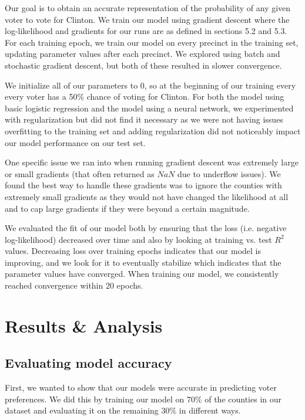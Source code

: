 \documentclass[10pt,twocolumn,letterpaper]{article}
\begin{document}
Our goal is to obtain an accurate representation of the probability of any given voter to vote for Clinton. We train our model using gradient descent where the log-likelihood and gradients for our runs are as defined in sections 5.2 and 5.3. For each training epoch, we train our model on every precinct in the training set, updating parameter values after each precinct. We explored using batch and stochastic gradient descent, but both of these resulted in slower convergence.

We initialize all of our parameters to 0, so at the beginning of our training every every voter has a 50\% chance of voting for Clinton. For both the model using basic logistic regression and the model using a neural network, we experimented with regularization but did not find it necessary as we were not having issues overfitting to the training set and adding regularization did not noticeably impact our model performance on our test set. 

One specific issue we ran into when running gradient descent was extremely large or small gradients (that often returned as $NaN$ due to underflow issues). We found the best way to handle these gradients was to ignore the counties with extremely small gradients as they would not have changed the likelihood at all and to cap large gradients if they were beyond a certain magnitude.

We evaluated the fit of our model both by ensuring that the loss (i.e. negative log-likelihood) decreased over time and also by looking at training vs. test $R^2$ values. Decreasing loss over training epochs indicates that our model is improving, and we look for it to eventually stabilize which indicates that the parameter values have converged. When training our model, we consistently reached convergence within 20 epochs.

\section{Results \& Analysis}

\subsection{Evaluating model accuracy}
First, we wanted to show that our models were accurate in predicting voter preferences. We did this by training our model on 70\% of the counties in our dataset and evaluating it on the remaining 30\% in different ways.
\end{document}
